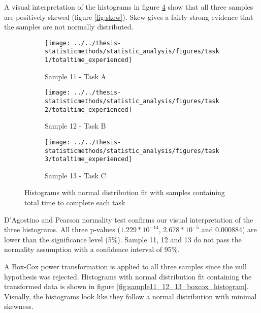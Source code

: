 \begin{appendices}
A visual interpretation of the histograms in figure \ref{fig:sample11_12_13_histogram} show that all three samples are positively skewed (figure \ref{fig:skew}). Skew gives a fairly strong evidence that the samples are not normally distributed.

\begin{figure}[H]
	\centering
	\begin{subfigure}[b]{0.32\textwidth}
		\centering
		\texttt{[image: ../../thesis-statisticmethods/statistic\_analysis/figures/task1/totaltime\_experienced]}
		\caption{Sample 11 - Task A}
		\label{fig:totaltimeexperienced_task1}
	\end{subfigure}
	\begin{subfigure}[b]{0.32\textwidth}
		\centering
		\texttt{[image: ../../thesis-statisticmethods/statistic\_analysis/figures/task2/totaltime\_experienced]}
		\caption{Sample 12 - Task B}
		\label{fig:totaltimeexperienced_task2}
	\end{subfigure}
	\begin{subfigure}[b]{0.32\textwidth}
		\centering
		\texttt{[image: ../../thesis-statisticmethods/statistic\_analysis/figures/task3/totaltime\_experienced]}
		\caption{Sample 13 - Task C}
		\label{fig:totaltimeexperienced}
	\end{subfigure}
	\caption{Histograms with normal distribution fit with samples containing total time to complete each task}
	\label{fig:sample11_12_13_histogram}
\end{figure}

D'Agostino and Pearson normality test confirms our visual interpretation of the three histograms. All three p-values ($1.229 * 10^{-14}$, $2.678 * 10^{-5}$ and $0.000884$) are lower than the significance level (5\%). Sample 11, 12 and 13 do not pass the normality assumption with a confidence interval of 95\%. 

A Box-Cox power transformation is applied to all three samples since the null hypothesis was rejected. Histograms with normal distribution fit containing the transformed data is shown in figure \ref{fig:sample11_12_13_boxcox_histogram}. Visually, the histograms look like they follow a normal distribution with minimal skewness. 


\end{appendices}
